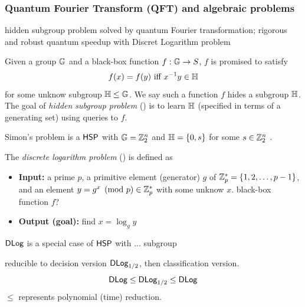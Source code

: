 \subsubsection{Quantum Fourier Transform (QFT) and algebraic problems}
hidden subgroup problem solved by quantum Fourier transformation\cite{childsQuantumAlgorithmsAlgebraic2010};
rigorous and robust quantum speedup with Discret Logarithm problem \cite{liuRigorousRobustQuantum2021} \cite{glickCovariantQuantumKernels2021}
\begin{problem}\label{prm:hidden_subgroup}
	Given a group $\mathbb{G}$ and a black-box function $f:\mathbb{G}\to S$, 
	$f$ is promised to satisfy 
	\begin{equation}
		f(x) =f(y) \text{ iff } x^{-1}y \in \mathbb{H} 
	\end{equation}
	for some unknow subgroup $\mathbb{H} \le \mathbb{G}$.
	We say such a function $f$ hides a subgroup $\mathbb{H}$.
	The goal of \emph{hidden subgroup problem} (\hsp) is to learn $\mathbb{H}$
	(specified in terms of a generating set) using queries to $f$.
\end{problem}
\begin{remark}
	Simon's problem \cite{simonPowerQuantumComputation1997}
	is a $\textsf{HSP}$ with $\mathbb{G} = \mathbb{Z}^n_2$ and $\mathbb{H} = \qty{ 0, s }$ for some $s \in \mathbb{Z}_2^n$ .
\end{remark}
\begin{problem}\label{prm:dlog}
	The \emph{discrete logarithm problem} (\dlog) is defined as
	\begin{itemize}
		\item \textbf{Input:} a prime $p$, a primitive element (generator) $g$ of $\mathbb{Z}_p^*=\qty{1,2,\dots,p-1}$, and an element $y=g^x \pmod{p} \in\mathbb{Z}_p^*$ with some unknow $x$. black-box function $f$?
		\item \textbf{Output (goal):} find $x=\log_g y$
	\end{itemize}
	$\textsf{DLog}$ is a special case of $\textsf{HSP}$ with ... subgroup 
\end{problem}
reducible to decision version $\textsf{DLog}_{1/2}$, then classification version.
\begin{equation}
	\textsf{DLog} \le \textsf{DLog}_{1/2} \le \textsf{DLog}
\end{equation}
$\le$ represents polynomial (time) reduction.


